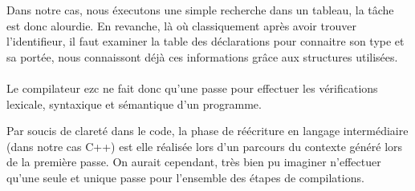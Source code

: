 Dans notre cas, nous éxecutons une simple recherche dans un tableau,
la tâche est donc alourdie. En revanche, là où classiquement après avoir trouver l'identifieur, 
il faut examiner la table des déclarations pour connaitre son type et sa portée, 
nous connaissont déjà ces informations grâce aux structures utilisées.

\paragraph{}Le compilateur ezc ne fait donc qu'une passe pour effectuer les vérifications lexicale, 
syntaxique et sémantique d'un programme.

Par soucis de clareté dans le code, la phase de réécriture en langage intermédiaire (dans notre cas C++)
est elle réalisée lors d'un parcours du contexte généré lors de la première passe. On aurait cependant, très bien
pu imaginer n'effectuer qu'une seule et unique passe pour l'ensemble des étapes de compilations.


